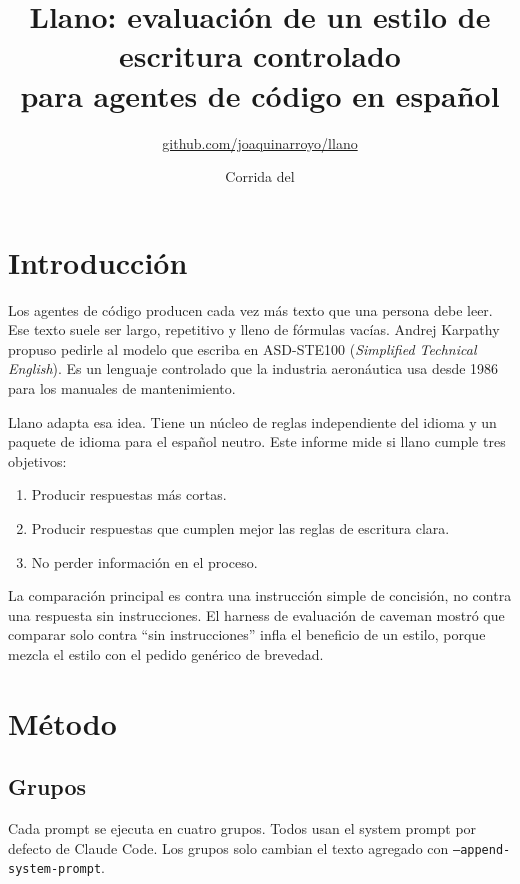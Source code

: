 \documentclass[11pt,a4paper]{article}
\title{Llano: evaluación de un estilo de escritura controlado\\para agentes de código en español}
\author{\href{https://github.com/joaquinarroyo/llano}{github.com/joaquinarroyo/llano}}
\date{Corrida del \evalDate}
\begin{document}
\maketitle

\begin{abstract}

\end{abstract}

\section{Introducción}

Los agentes de código producen cada vez más texto que una persona debe leer. Ese texto suele ser largo, repetitivo y lleno de fórmulas vacías. Andrej Karpathy propuso pedirle al modelo que escriba en ASD-STE100 (\emph{Simplified Technical English}). Es un lenguaje controlado que la industria aeronáutica usa desde 1986 para los manuales de mantenimiento.

Llano adapta esa idea. Tiene un núcleo de reglas independiente del idioma y un paquete de idioma para el español neutro. Este informe mide si llano cumple tres objetivos:

\begin{enumerate}
  \item Producir respuestas más cortas.
  \item Producir respuestas que cumplen mejor las reglas de escritura clara.
  \item No perder información en el proceso.
\end{enumerate}

La comparación principal es contra una instrucción simple de concisión, no contra una respuesta sin instrucciones. El harness de evaluación de caveman mostró que comparar solo contra ``sin instrucciones'' infla el beneficio de un estilo, porque mezcla el estilo con el pedido genérico de brevedad.

\section{Método}

\subsection{Grupos}

Cada prompt se ejecuta en cuatro grupos. Todos usan el system prompt por defecto de Claude Code. Los grupos solo cambian el texto agregado con \texttt{--append-system-prompt}.
\end{document}
